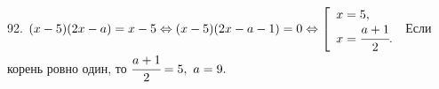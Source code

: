 92. $(x-5)(2x-a)=x-5\Leftrightarrow(x-5)(2x-a-1)=0\Leftrightarrow \left[\begin{array}{l}x=5,\\ x=\cfrac{a+1}{2}.\end{array}\right.$
Если корень ровно один, то $\cfrac{a+1}{2}=5,\ a=9.$\\
